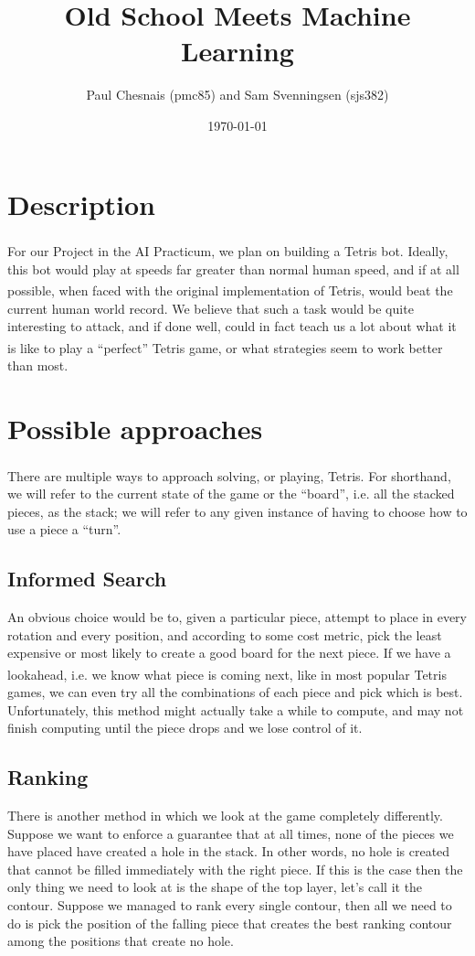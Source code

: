 \documentclass{article}
\title{Old School \tetris{} Meets Machine Learning}
\author{Paul Chesnais (pmc85) and Sam Svenningsen (sjs382)}
\date{\today}
\def\tetris{Tetris\textsuperscript{\textregistered}}
\begin{document}
\maketitle
\thispagestyle{empty}

\section{Description}

\par For our Project in the AI Practicum, we plan on building a \tetris{} bot. Ideally, this bot would play at speeds far greater than normal human speed, and if at all possible, when faced with the original implementation of \tetris{}, would beat the current human world record. We believe that such a task would be quite interesting to attack, and if done well, could in fact teach us a lot about what it is like to play a ``perfect'' \tetris{} game, or what strategies seem to work better than most.

\section{Possible approaches}

\par There are multiple ways to approach solving, or playing, \tetris{}. For shorthand, we will refer to the current state of the game or the ``board'', i.e. all the stacked pieces, as the stack; we will refer to any given instance of having to choose how to use a piece a ``turn''.

\subsection{Informed Search} An obvious choice would be to, given a particular piece, attempt to place in every rotation and every position, and according to some cost metric, pick the least expensive or most likely to create a good board for the next piece. If we have a lookahead, i.e. we know what piece is coming next, like in most popular \tetris{} games, we can even try all the combinations of each piece and pick which is best. Unfortunately, this method might actually take a while to compute, and may not finish computing until the piece drops and we lose control of it.

\subsection{Ranking} There is another method in which we look at the game completely differently. Suppose we want to enforce a guarantee that at all times, none of the pieces we have placed have created a hole in the stack. In other words, no hole is created that cannot be filled immediately with the right piece. If this is the case then the only thing we need to look at is the shape of the top layer, let's call it the contour. Suppose we managed to rank every single contour, then all we need to do is pick the position of the falling piece that creates the best ranking contour among the positions that create no hole.
\end{document}
